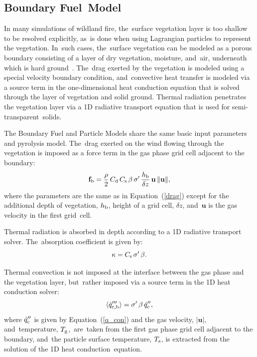 \documentclass[atmosphere,article,accept,moreauthors,pdftex]{Definitions/mdpi}
\begin{document}
\begin{paracol}{2}
\subsection{Boundary Fuel~Model}

In many simulations of wildland fire, the~surface vegetation layer is too shallow to be resolved explicitly, as~is done when using Lagrangian particles to represent the vegetation. In~such cases, the~surface vegetation can be modeled as a porous boundary consisting of a layer of dry vegetation, moisture, and~air, underneath which is hard ground~\cite{Mell:IJWF2007}. The~drag exerted by the vegetation is modeled using a special velocity boundary condition, and~convective heat transfer is modeled via a source term in the one-dimensional heat conduction equation that is solved through the layer of vegetation and solid ground. Thermal radiation penetrates the vegetation layer via a 1D radiative transport equation that is used for semi-transparent~solids.

The Boundary Fuel and Particle Models share the same basic input parameters and pyrolysis model. The~drag exerted on the wind flowing through the vegetation is imposed as a force term in the gas phase grid cell adjacent to the boundary:
\begin{equation}
    \mathbf{f}_{\rm b} = \frac{\rho}{2} \, C_{\rm d} \, C_{\rm s} \, \beta \, \sigma' \, \frac{h_{\rm b}}{\delta z} \, \mathbf{u} \, \|\mathbf{u}\|,
\end{equation}
where the parameters are the same as in Equation~(\ref{drag}) except for the additional depth of vegetation, $h_{\rm b}$, height of a grid cell, $\delta z$, and~$\mathbf{u}$ is the gas velocity in the first grid~cell.

Thermal radiation is absorbed in depth according to a 1D radiative transport solver. The~absorption coefficient is given by:
\begin{equation}
   \kappa = C_{\rm s} \, \sigma' \, \beta.
\end{equation}

Thermal convection is not imposed at the interface between the gas phase and the vegetation layer, but~rather imposed via a source term in the 1D heat conduction solver:
\begin{equation}
   \langle \dot{q}_{\rm c,b}''' \rangle = \sigma' \, \beta \, \dot{q}_{\rm c}'', 
\end{equation}
where $\dot{q}_{\rm c}''$ is given by Equation~(\ref{q_con}) and the gas velocity, $|\mathbf{u}|$, and~temperature, \mbox{$T_{\rm g}$, are taken} from the first gas phase grid cell adjacent to the boundary, and~the particle surface temperature, $T_{\rm s}$, is extracted from the solution of the 1D heat conduction~equation.



\end{paracol}
\end{document}
